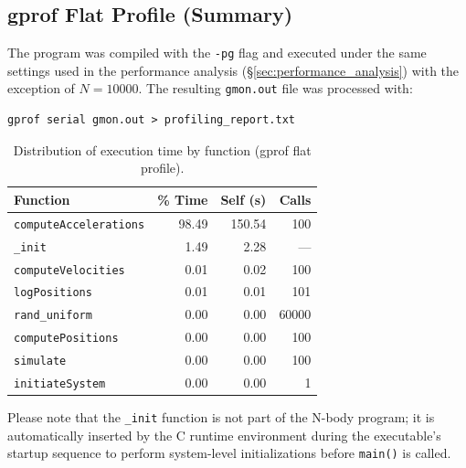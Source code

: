 \documentclass{article}
\begin{document}
\subsection{gprof Flat Profile (Summary)}
\label{appendix:gprof_results}
The program was compiled with the \texttt{-pg} flag and executed under the same settings used in the performance analysis (\S\ref{sec:performance_analysis}) with the exception of $N = 10000$. The resulting \texttt{gmon.out} file was processed with:
\begin{verbatim}
gprof serial gmon.out > profiling_report.txt
\end{verbatim}
\begin{table}[H]
\centering
\label{tab:gprof_summary}
\begin{tabular}{lrrr}
\toprule
\textbf{Function} & \textbf{\% Time} & \textbf{Self (s)} & \textbf{Calls}  \\
\midrule
\texttt{computeAccelerations} & 98.49 & 150.54 & 100 \\
\texttt{\_init}               &  1.49 &   2.28 & --- \\
\texttt{computeVelocities}    &  0.01 &   0.02 & 100 \\
\texttt{logPositions}         &  0.01 &   0.01 & 101 \\
\texttt{rand\_uniform}        &  0.00 &   0.00 & 60000 \\
\texttt{computePositions}     &  0.00 &   0.00 & 100 \\
\texttt{simulate}             &  0.00 &   0.00 & 100 \\
\texttt{initiateSystem}       &  0.00 &   0.00 & 1   \\
\bottomrule
\end{tabular}
\caption{Distribution of execution time by function (gprof flat profile).}
\end{table}
Please note that the \texttt{\_init} function is not part of the N-body program; it is automatically inserted by the C runtime environment during the executable’s startup sequence to perform system-level 
initializations before \texttt{main()} is called.
\end{document}

